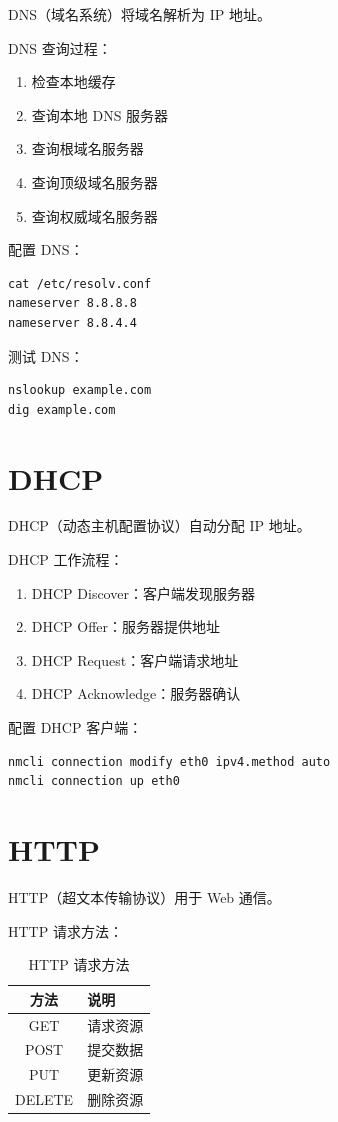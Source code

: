 \documentclass[12pt,UTF8]{ctexbook}
\begin{document}
DNS（域名系统）将域名解析为 IP 地址。

DNS 查询过程：
\begin{enumerate}
    \item 检查本地缓存
    \item 查询本地 DNS 服务器
    \item 查询根域名服务器
    \item 查询顶级域名服务器
    \item 查询权威域名服务器
\end{enumerate}

配置 DNS：
\begin{verbatim}
cat /etc/resolv.conf
nameserver 8.8.8.8
nameserver 8.8.4.4
\end{verbatim}

测试 DNS：
\begin{verbatim}
nslookup example.com
dig example.com
\end{verbatim}

\section{DHCP}
\label{sec:dhcp}

DHCP（动态主机配置协议）自动分配 IP 地址。

DHCP 工作流程：
\begin{enumerate}
    \item DHCP Discover：客户端发现服务器
    \item DHCP Offer：服务器提供地址
    \item DHCP Request：客户端请求地址
    \item DHCP Acknowledge：服务器确认
\end{enumerate}

配置 DHCP 客户端：
\begin{verbatim}
nmcli connection modify eth0 ipv4.method auto
nmcli connection up eth0
\end{verbatim}

\section{HTTP}
\label{sec:http}

HTTP（超文本传输协议）用于 Web 通信。

HTTP 请求方法：
\begin{table}[htbp]
    \centering
    \caption{HTTP 请求方法}
    \begin{tabular}{|c|p{8cm}|}
        \hline
        \textbf{方法} & \textbf{说明} \\
        \hline
        GET & 请求资源 \\
        \hline
        POST & 提交数据 \\
        \hline
        PUT & 更新资源 \\
        \hline
        DELETE & 删除资源 \\
        \hline
    \end{tabular}
\end{table}
\end{document}
